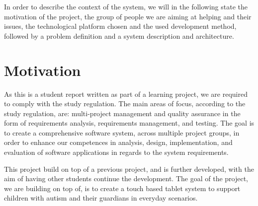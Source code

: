 In order to describe the context of the system, we will in the following state the motivation of the project, the group of people we are aiming at helping and their issues, the technological platform chosen and the used development method, followed by a problem definition and a system description and architecture.

\section{Motivation}
As this is a student report written as part of a learning project, we are required to comply with the study regulation.
The main areas of focus, according to the study regulation, are: multi-project management and quality assurance in the form of requirements analysis, requirements management, and testing.
The goal is to create a comprehensive software system, across multiple project groups, in order to enhance our competences in analysis, design, implementation, and evaluation of software applications in regards to the system requirements\cite{studyreg}.

This project build on top of a previous project, and is further developed, with the aim of having other students continue the development.
The goal of the project, we are building on top of, is to create a touch based tablet system to support children with autism and their guardians in everyday scenarios.